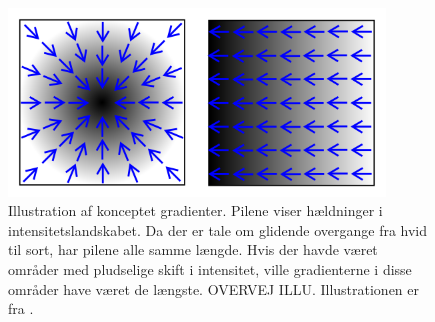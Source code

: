 \begin{figure}[htp]
\centering
\includegraphics[width=10cm]{system/illu/gradienter.png} 
\caption{Illustration af konceptet gradienter. Pilene viser hældninger i intensitetslandskabet. Da der er tale om glidende overgange fra hvid til sort, har pilene alle samme længde. Hvis der havde været områder med pludselige skift i intensitet, ville gradienterne i disse områder have været de længste. OVERVEJ ILLU. Illustrationen er fra \cite{wiki_gradienter}.}
\label{fig:gradienter}
\end{figure}

